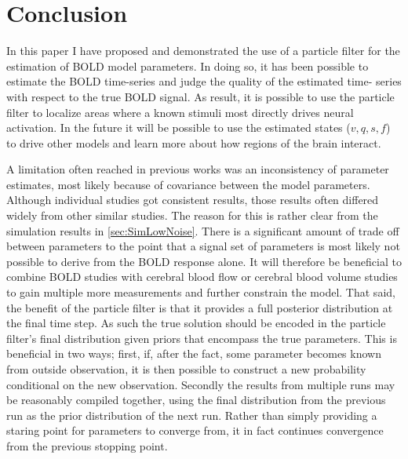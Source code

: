 \chapter{Conclusion}
In this paper I have proposed and demonstrated the use of a particle filter
for the estimation of BOLD model parameters. In doing so, it has been possible
to estimate the BOLD time-series and judge the quality of the estimated time-
series with respect to the true BOLD signal. As result, it is possible to use
the particle filter to localize areas where a known stimuli most directly drives
neural activation. In the future it will be possible to use the estimated states
($v,q,s,f$) to drive other models and learn more about how regions of the brain
interact. 

A limitation often reached in previous works was an inconsistency of
parameter estimates, most likely because of covariance between the model parameters.
Although individual studies got consistent results, those results often differed
widely from other similar studies. The reason for this is rather clear from the
simulation results in \autoref{sec:SimLowNoise}. There is a significant amount of
trade off between parameters to the point that a signal set of parameters
is most likely not possible to derive from the BOLD response alone. It
will therefore be beneficial to combine BOLD studies with cerebral blood
flow or cerebral blood volume studies to gain multiple more measurements and
further constrain the model. That said, the benefit of the particle filter
is that it provides a full posterior distribution at the final time step.
As such the true solution should be encoded in the particle filter's final 
distribution given priors that encompass the true parameters. This is beneficial
in two ways; first, if, after the fact, some parameter becomes known 
from outside observation, it is then possible to construct a new probability
conditional on the new observation. Secondly the results from multiple runs
may be reasonably compiled together, using the final distribution from the previous
run as the prior distribution of the next run. Rather than simply providing a 
staring point for parameters to converge from, it in fact continues convergence
from the previous stopping point. 

